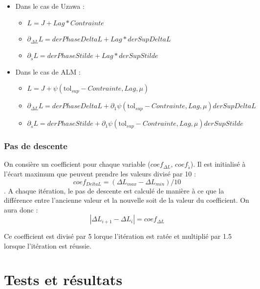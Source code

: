 \documentclass[11pt,a4paper]{article}
\begin{document}
\begin{itemize}
	\item Dans le cas de Uzawa : 
		\begin{itemize}
			\item $L=J+Lag*Contrainte$
			\item $\partial_{\Delta L}L=derPhaseDeltaL+Lag*derSupDeltaL$
			\item $\partial_{\tilde{s}}L=derPhaseStilde+Lag*derSupStilde$	
		\end{itemize}
		
	\item Dans le cas de ALM :	
		\begin{itemize}
			\item $L=J+\psi\left(\textrm{tol}_{sup}-Contrainte,Lag,\mu\right)$
			\item $\partial_{\Delta L}L=derPhaseDeltaL+\partial_1\psi\left(\textrm{tol}_{sup}-Contrainte,Lag,\mu\right)derSupDeltaL$
			\item $\partial_{\tilde{s}}L=derPhaseStilde+\partial_1\psi\left(\textrm{tol}_{sup}-Contrainte,Lag,\mu\right)derSupStilde$	
		\end{itemize}
\end{itemize}	



\subsubsection*{Pas de descente}
On consière un coefficient pour chaque variable ($coef_{\Delta L},\,coef_{\tilde{s}}$). Il est initialisé à l'écart maximum que peuvent prendre les valeurs divisé par 10 :
\begin{equation}
coef_{Delta L}=\left(\Delta L _{max}-\Delta L_{min}\right)/10
\end{equation}. 
A chaque itération, le pas de descente est calculé de manière à ce que la différence entre l'ancienne valeur et la nouvelle soit de la valeur du coefficient. On aura donc :
\begin{equation}
|\Delta L_{i+1}-\Delta L_{i}|=coef_{\Delta L}
\end{equation}

Ce coefficient est divisé par 5 lorque l'itération est ratée et multiplié par 1.5 lorsque l'itération est réussie.

\section*{Tests et résultats}
\end{document}
